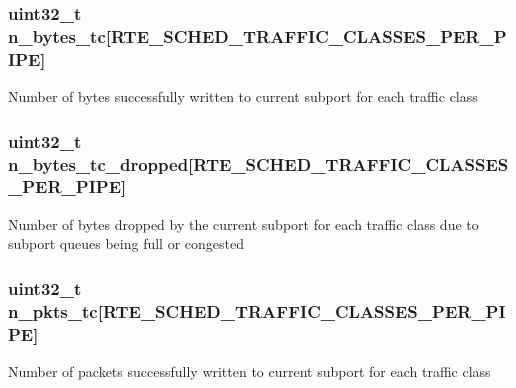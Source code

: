 \subsubsection[{n\+\_\+bytes\+\_\+tc}]{\setlength{\rightskip}{0pt plus 5cm}uint32\+\_\+t n\+\_\+bytes\+\_\+tc\mbox{[}{\bf R\+T\+E\+\_\+\+S\+C\+H\+E\+D\+\_\+\+T\+R\+A\+F\+F\+I\+C\+\_\+\+C\+L\+A\+S\+S\+E\+S\+\_\+\+P\+E\+R\+\_\+\+P\+I\+P\+E}\mbox{]}}\label{structrte__sched__subport__stats_a38f0b041af6cf64c093e0fb395ce1d94}
Number of bytes successfully written to current subport for each traffic class \hypertarget{structrte__sched__subport__stats_acc9e8525ec3777870d8c2499cc50a728}{}
\subsubsection[{n\+\_\+bytes\+\_\+tc\+\_\+dropped}]{\setlength{\rightskip}{0pt plus 5cm}uint32\+\_\+t n\+\_\+bytes\+\_\+tc\+\_\+dropped\mbox{[}{\bf R\+T\+E\+\_\+\+S\+C\+H\+E\+D\+\_\+\+T\+R\+A\+F\+F\+I\+C\+\_\+\+C\+L\+A\+S\+S\+E\+S\+\_\+\+P\+E\+R\+\_\+\+P\+I\+P\+E}\mbox{]}}\label{structrte__sched__subport__stats_acc9e8525ec3777870d8c2499cc50a728}
Number of bytes dropped by the current subport for each traffic class due to subport queues being full or congested \hypertarget{structrte__sched__subport__stats_a820011cbf80ddbae81c9afcaef796efd}{}
\subsubsection[{n\+\_\+pkts\+\_\+tc}]{\setlength{\rightskip}{0pt plus 5cm}uint32\+\_\+t n\+\_\+pkts\+\_\+tc\mbox{[}{\bf R\+T\+E\+\_\+\+S\+C\+H\+E\+D\+\_\+\+T\+R\+A\+F\+F\+I\+C\+\_\+\+C\+L\+A\+S\+S\+E\+S\+\_\+\+P\+E\+R\+\_\+\+P\+I\+P\+E}\mbox{]}}\label{structrte__sched__subport__stats_a820011cbf80ddbae81c9afcaef796efd}
Number of packets successfully written to current subport for each traffic class \hypertarget{structrte__sched__subport__stats_ad5b91fa708c8df9e3690aaa8a32c787b}{}
